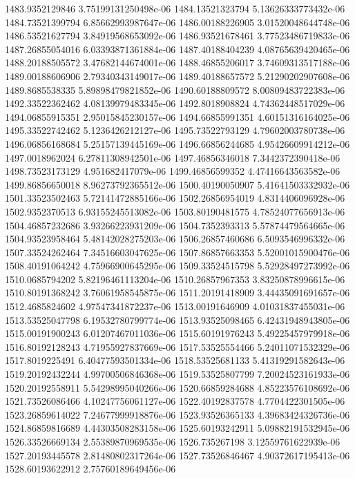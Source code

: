 {1483.9352129846 3.75199131250498e-06
1484.13521323794 5.13626333773432e-06
1484.73521399794 6.85662993987647e-06
1486.00188226905 3.01520048644748e-06
1486.53521627794 3.84919568653092e-06
1486.93521678461 3.77523486719833e-06
1487.26855054016 6.03393871361884e-06
1487.40188404239 4.08765639420465e-06
1488.20188505572 3.47682144674001e-06
1488.46855206017 3.74609313517188e-06
1489.00188606906 2.79340343149017e-06
1489.40188657572 5.21290202907608e-06
1489.8685538335 5.89898479821852e-06
1490.60188809572 8.00809483722383e-06
1492.33522362462 4.08139979483345e-06
1492.8018908824 4.74362448517029e-06
1494.06855915351 2.95015845230157e-06
1494.66855991351 4.60151316164025e-06
1495.33522742462 5.1236426212127e-06
1495.73522793129 4.79602003780738e-06
1496.06856168684 5.25157139445169e-06
1496.66856244685 4.95426609914212e-06
1497.0018962024 6.27811308942501e-06
1497.46856346018 7.3442372390418e-06
1498.73523173129 4.951682417079e-06
1499.46856599352 4.47416643563582e-06
1499.86856650018 8.96273792365512e-06
1500.40190050907 5.41641503332932e-06
1501.33523502463 5.72141472885166e-06
1502.26856954019 4.8314406096928e-06
1502.9352370513 6.93155245513082e-06
1503.80190481575 4.78524077656913e-06
1504.46857232686 3.93266223931209e-06
1504.7352393313 5.57874479564665e-06
1504.93523958464 5.48142028275203e-06
1506.26857460686 6.5093546996332e-06
1507.33524262464 7.34516603047625e-06
1507.86857663353 5.52001015900476e-06
1508.40191064242 4.75966900645295e-06
1509.33524515798 5.52928497273992e-06
1510.0685794202 5.82196461113204e-06
1510.26857967353 3.83250878996615e-06
1510.80191368242 3.76061958545875e-06
1511.20191418909 3.44435091691657e-06
1512.4685824602 4.97547341872237e-06
1513.00191646909 4.01031837455031e-06
1513.53525047798 6.19532780799774e-06
1513.93525098465 6.42431948943805e-06
1515.00191900243 6.01207467011036e-06
1515.60191976243 5.49225457979918e-06
1516.80192128243 4.71955927837669e-06
1517.53525554466 5.24011071532329e-06
1517.8019225491 6.40477593501334e-06
1518.53525681133 5.41319291582643e-06
1519.20192432244 4.99700506846368e-06
1519.53525807799 7.20024523161933e-06
1520.20192558911 5.54298995040266e-06
1520.66859284688 4.85223576108692e-06
1521.73526086466 4.10247756061127e-06
1522.40192837578 4.7704422301505e-06
1523.26859614022 7.24677999918876e-06
1523.93526365133 4.39683424326736e-06
1524.86859816689 4.44303508283158e-06
1525.60193242911 5.09882191532945e-06
1526.33526669134 2.55389870969535e-06
1526.735267198 3.12559761622939e-06
1527.20193445578 2.81480802317264e-06
1527.73526846467 4.90372617195413e-06
1528.60193622912 2.75760189649456e-06
}
